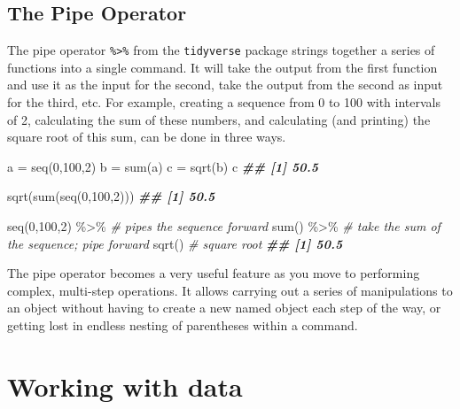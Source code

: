 \documentclass[
  12pt,
]{krantz}
\newenvironment{Shaded}{\begin{snugshade}}{\end{snugshade}}
\newcommand{\CommentTok}[1]{\textcolor[rgb]{0.56,0.35,0.01}{\textit{#1}}}
\newcommand{\DecValTok}[1]{\textcolor[rgb]{0.00,0.00,0.81}{#1}}
\newcommand{\DocumentationTok}[1]{\textcolor[rgb]{0.56,0.35,0.01}{\textbf{\textit{#1}}}}
\newcommand{\FunctionTok}[1]{\textcolor[rgb]{0.00,0.00,0.00}{#1}}
\newcommand{\NormalTok}[1]{#1}
\newcommand{\OtherTok}[1]{\textcolor[rgb]{0.56,0.35,0.01}{#1}}
\newcommand{\SpecialCharTok}[1]{\textcolor[rgb]{0.00,0.00,0.00}{#1}}
\begin{document}
\hypertarget{the-pipe-operator}{%
\section{The Pipe Operator}\label{the-pipe-operator}}

The pipe operator \texttt{\%\textgreater{}\%} from the \texttt{tidyverse} package strings together a series of functions into a single command. It will take the output from the first function and use it as the input for the second, take the output from the second as input for the third, etc. For example, creating a sequence from 0 to 100 with intervals of 2, calculating the sum of these numbers, and calculating (and printing) the square root of this sum, can be done in three ways.

\begin{Shaded}
\begin{Highlighting}[]
\NormalTok{  a }\OtherTok{=} \FunctionTok{seq}\NormalTok{(}\DecValTok{0}\NormalTok{,}\DecValTok{100}\NormalTok{,}\DecValTok{2}\NormalTok{) }
\NormalTok{  b }\OtherTok{=} \FunctionTok{sum}\NormalTok{(a)}
\NormalTok{  c }\OtherTok{=} \FunctionTok{sqrt}\NormalTok{(b)}
\NormalTok{  c}
\DocumentationTok{\#\# [1] 50.5}
     
  \FunctionTok{sqrt}\NormalTok{(}\FunctionTok{sum}\NormalTok{(}\FunctionTok{seq}\NormalTok{(}\DecValTok{0}\NormalTok{,}\DecValTok{100}\NormalTok{,}\DecValTok{2}\NormalTok{)))}
\DocumentationTok{\#\# [1] 50.5}

  \FunctionTok{seq}\NormalTok{(}\DecValTok{0}\NormalTok{,}\DecValTok{100}\NormalTok{,}\DecValTok{2}\NormalTok{) }\SpecialCharTok{\%\textgreater{}\%}   \CommentTok{\# pipes the sequence forward   }
    \FunctionTok{sum}\NormalTok{() }\SpecialCharTok{\%\textgreater{}\%}        \CommentTok{\# take the sum of the sequence; pipe forward }
    \FunctionTok{sqrt}\NormalTok{()           }\CommentTok{\# square root}
\DocumentationTok{\#\# [1] 50.5}
\end{Highlighting}
\end{Shaded}

The pipe operator becomes a very useful feature as you move to performing complex, multi-step operations. It allows carrying out a series of manipulations to an object without having to create a new named object each step of the way, or getting lost in endless nesting of parentheses within a command.

\hypertarget{working-with-data}{%
\chapter{Working with data}\label{working-with-data}}
\end{document}
